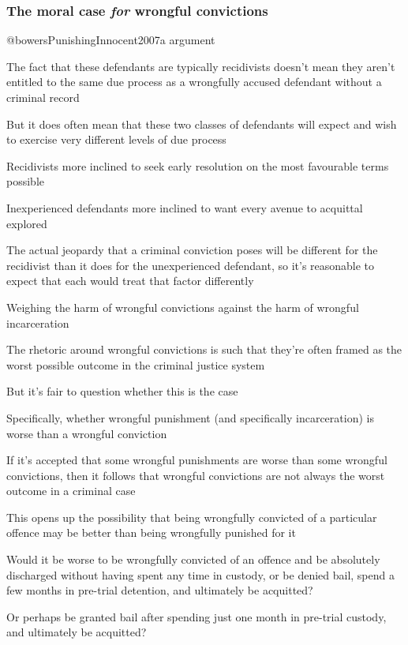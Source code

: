 \subsubsection{The moral case \textit{for} wrongful convictions}

@bowersPunishingInnocent2007a argument

The fact that these defendants are typically recidivists doesn't mean they aren't entitled to the same due process as a wrongfully accused defendant without a criminal record

But it does often mean that these two classes of defendants will expect and wish to exercise very different levels of due process

Recidivists more inclined to seek early resolution on the most favourable terms possible

Inexperienced defendants more inclined to want every avenue to acquittal explored

The actual jeopardy that a criminal conviction poses will be different for the recidivist than it does for the unexperienced defendant, so it's reasonable to expect that each would treat that factor differently

Weighing the harm of wrongful convictions against the harm of wrongful incarceration

The rhetoric around wrongful convictions is such that they're often framed as the worst possible outcome in the criminal justice system

But it's fair to question whether this is the case

Specifically, whether wrongful punishment (and specifically incarceration) is worse than a wrongful conviction

If it's accepted that some wrongful punishments are worse than some wrongful convictions, then it follows that wrongful convictions are not always the worst outcome in a criminal case

This opens up the possibility that being wrongfully convicted of a particular offence may be better than being wrongfully punished for it

Would it be worse to be wrongfully convicted of an offence and be absolutely discharged without having spent any time in custody, or be denied bail, spend a few months in pre-trial detention, and ultimately be acquitted?

Or perhaps be granted bail after spending just one month in pre-trial custody, and ultimately be acquitted?

